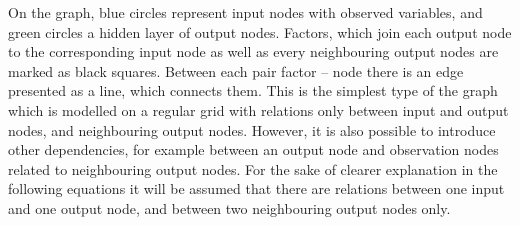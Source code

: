 On the graph, blue circles represent input nodes with observed variables, and green circles a hidden layer of output nodes. Factors, which join each output node to the corresponding input node as well as every neighbouring output nodes are marked as black squares. Between each pair factor – node there is an edge presented as a line, which connects them. This is the simplest type of the graph which is modelled on a regular grid with relations only between input and output nodes, and neighbouring output nodes. However, it is also possible to introduce other dependencies, for example between an output node and observation nodes related to neighbouring output nodes. For the sake of clearer explanation in the following equations it will be assumed that there are relations between one input and one output node, and between two neighbouring output nodes only.


